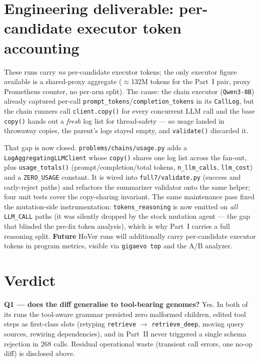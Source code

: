 \documentclass[11pt]{article}
\begin{document}
\section{Engineering deliverable: per-candidate executor token accounting}
\label{sec:tokentrack}
These runs carry \emph{no} per-candidate executor tokens; the only executor figure available is
a shared-proxy aggregate ($\approx$132M tokens for the Part~I pair, proxy Prometheus counter, no
per-arm split). The cause: the chain executor (\texttt{Qwen3-8B}) already captured per-call
\texttt{prompt\_tokens}/\texttt{completion\_tokens} in its \texttt{CallLog}, but the chain
runners call \texttt{client.copy()} for every concurrent LLM call and the base \texttt{copy()}
hands out a \emph{fresh} log list for thread-safety --- so usage landed in throwaway copies, the
parent's logs stayed empty, and \texttt{validate()} discarded it.

That gap is now closed. \texttt{problems/chains/usage.py} adds a \texttt{LogAggregatingLLMClient}
whose \texttt{copy()} shares one log list across the fan-out, plus \texttt{usage\_totals()}
(prompt/completion/total tokens, \texttt{n\_llm\_calls}, \texttt{llm\_cost}) and a
\texttt{ZERO\_USAGE} constant. It is wired into \texttt{full7/validate.py} (success and
early-reject paths) and refactors the summarizer validator onto the same helper; four unit tests
cover the copy-sharing invariant. The same maintenance pass fixed the mutation-side
instrumentation: \texttt{tokens\_reasoning} is now emitted on \emph{all} \texttt{LLM\_CALL}
paths (it was silently dropped by the stock mutation agent --- the gap that blinded the pre-fix
token analysis), which is why Part~I carries a full reasoning split. \textbf{Future} HoVer runs
will additionally carry per-candidate executor tokens in program metrics, visible via
\texttt{gigaevo top} and the A/B analyzer.

\section{Verdict}
\label{sec:verdict}
\textbf{Q1 --- does the diff generalise to tool-bearing genomes?} Yes. In both of its runs the
tool-aware grammar persisted zero malformed children, edited tool steps as first-class slots
(retyping \texttt{retrieve} $\to$ \texttt{retrieve\_deep}, moving query sources, rewiring
dependencies), and in Part~II never triggered a single schema rejection in 268 calls. Residual
operational waste (transient call errors, one no-op diff) is disclosed above.
\end{document}
